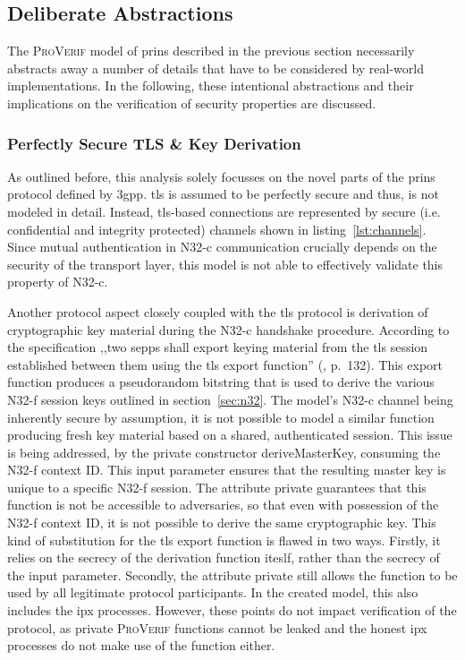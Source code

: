 \subsection{Deliberate Abstractions}
\label{ssec:abstractions}

The \textsc{ProVerif} model of \gls{prins} described in the previous section necessarily abstracts away a number of details that have to be considered by real-world implementations.
In the following, these intentional abstractions and their implications on the verification of security properties are discussed.

\subsubsection{Perfectly Secure TLS \& Key Derivation}

As outlined before, this analysis solely focusses on the novel parts of the \gls{prins} protocol defined by \gls{3gpp}.
\gls{tls} is assumed to be perfectly secure and thus, is not modeled in detail.
Instead, \gls{tls}-based connections are represented by secure (i.e. confidential and integrity protected) channels shown in listing~\ref{lst:channels}.
Since mutual authentication in N32-c communication crucially depends on the security of the transport layer, this model is not able to effectively validate this property of N32-c.

Another protocol aspect closely coupled with the \gls{tls} protocol is derivation of cryptographic key material during the N32-c handshake procedure.
According to the specification ,,two \glspl{sepp} shall export keying material from the \gls{tls} session established between them using the \gls{tls} export function'' (\cite{3gpp.33.501}, p.~132).
This export function produces a pseudorandom bitstring that is used to derive the various N32-f session keys outlined in section~\ref{sec:n32}.
The model's N32-c channel being inherently secure by assumption, it is not possible to model a similar function producing fresh key material based on a shared, authenticated session.
This issue is being addressed, by the private constructor {\sffamily deriveMasterKey}, consuming the N32-f context ID.
This input parameter ensures that the resulting master key is unique to a specific N32-f session.
The attribute {\sffamily private} guarantees that this function is not be accessible to adversaries, so that even with possession of the N32-f context ID, it is not possible to derive the same cryptographic key.
This kind of substitution for the \gls{tls} export function is flawed in two ways. Firstly, it relies on the secrecy of the derivation function iteslf, rather than the secrecy of the input parameter.
Secondly, the attribute {\sffamily private} still allows the function to be used by all legitimate protocol participants.
In the created model, this also includes the \gls{ipx} processes.
However, these points do not impact verification of the protocol, as private \textsc{ProVerif} functions cannot be leaked and the honest \gls{ipx} processes do not make use of the function either.

